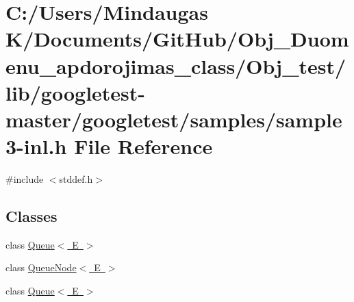 \hypertarget{_obj__test_2lib_2googletest-master_2googletest_2samples_2sample3-inl_8h}{}\section{C\+:/\+Users/\+Mindaugas K/\+Documents/\+Git\+Hub/\+Obj\+\_\+\+Duomenu\+\_\+apdorojimas\+\_\+class/\+Obj\+\_\+test/lib/googletest-\/master/googletest/samples/sample3-\/inl.h File Reference}
\label{_obj__test_2lib_2googletest-master_2googletest_2samples_2sample3-inl_8h}
{\ttfamily \#include $<$stddef.\+h$>$}\newline
\subsection*{Classes}
\begin{DoxyCompactItemize}
\item 
class \mbox{\hyperlink{class_queue}{Queue$<$ E $>$}}
\item 
class \mbox{\hyperlink{class_queue_node}{Queue\+Node$<$ E $>$}}
\item 
class \mbox{\hyperlink{class_queue}{Queue$<$ E $>$}}
\end{DoxyCompactItemize}
